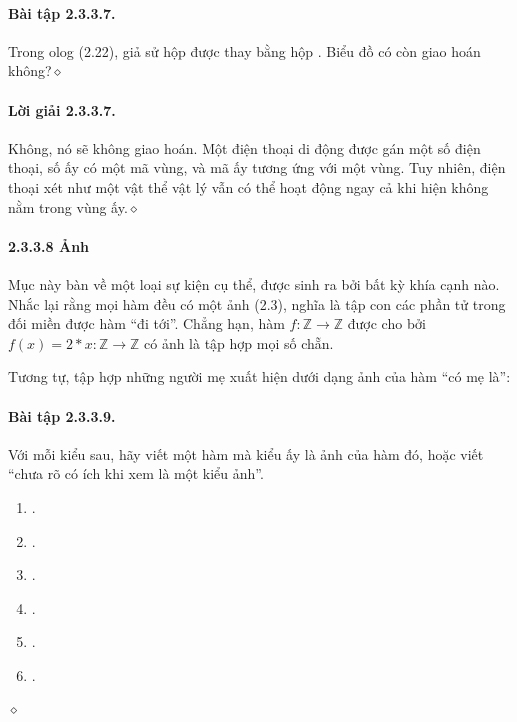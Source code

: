 \paragraph{Bài tập 2.3.3.7.} Trong olog (2.22), giả sử hộp  được thay bằng hộp . Biểu đồ có còn giao hoán không?\hfill$\diamond$
\paragraph{Lời giải 2.3.3.7.} Không, nó sẽ không giao hoán. Một điện thoại di động được gán một số điện thoại, số ấy có một mã vùng, và mã ấy tương ứng với một vùng. Tuy nhiên, điện thoại xét như một vật thể vật lý vẫn có thể hoạt động ngay cả khi hiện không nằm trong vùng ấy.\hfill$\diamond$
\paragraph{2.3.3.8 Ảnh}
Mục này bàn về một loại sự kiện cụ thể, được sinh ra bởi bất kỳ khía cạnh nào. Nhắc lại rằng mọi hàm đều có một ảnh (2.3), nghĩa là tập con các phần tử trong đối miền được hàm ``đi tới''. Chẳng hạn, hàm $f:\mathbb Z\to\mathbb Z$ được cho bởi $f(x)=2*x:\mathbb Z\to\mathbb Z$ có ảnh là tập hợp mọi số chẵn.

Tương tự, tập hợp những người mẹ xuất hiện dưới dạng ảnh của hàm ``có mẹ là'':
\begin{center}\end{center}
\paragraph{Bài tập 2.3.3.9.} Với mỗi kiểu sau, hãy viết một hàm mà kiểu ấy là ảnh của hàm đó, hoặc viết ``chưa rõ có ích khi xem là một kiểu ảnh''.
\begin{enumerate}[label=\alph*.]
\item {}.
\item {}.
\item {}.
\item {}.
\item {}.
\item {}.
\end{enumerate}\hfill$\diamond$
